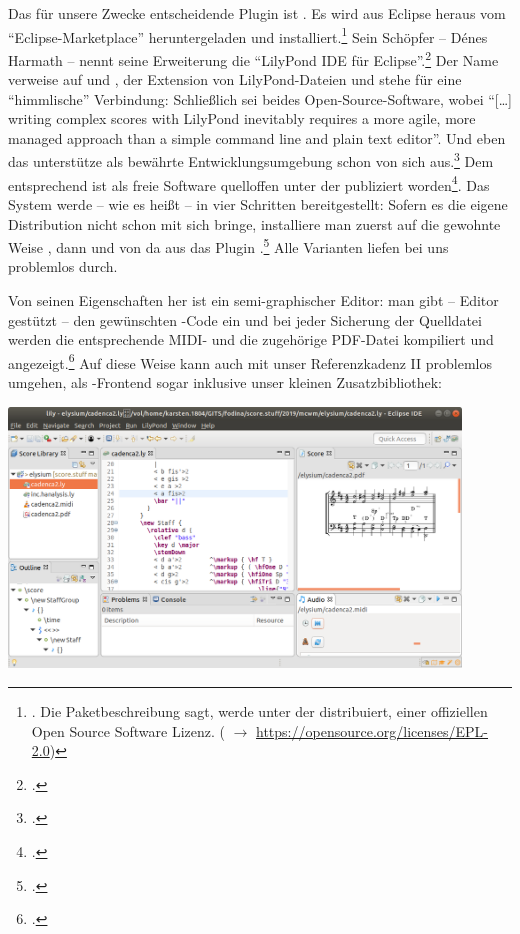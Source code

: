 Das für unsere Zwecke entscheidende Plugin ist . Es wird aus
Eclipse heraus vom \enquote{Eclipse-Marketplace} heruntergeladen und
installiert.\footnote{\cite[vgl.][\nopage wp]{Harmath2019a}. Die
Paketbeschreibung sagt,  werde unter der  distribuiert, einer offiziellen Open Source Software Lizenz.
( $\rightarrow$ \href{https://opensource.org/licenses/EPL-2.0}
{https://opensource.org/licenses/EPL-2.0}) } Sein Schöpfer -- Dénes Harmath --
nennt seine Erweiterung die \enquote{LilyPond IDE für
Eclipse}.\footcite[vgl.][\nopage wp]{Harmath2019b} Der Name 
verweise auf  und , der Extension von LilyPond-Dateien und
stehe für eine \enquote{himmlische} Verbindung: Schließlich sei beides
Open-Source-Software, wobei \enquote{[\ldots] writing complex scores with
LilyPond inevitably requires a more agile, more managed approach than a simple
command line and plain text editor}. Und eben das unterstütze  als
bewährte Entwicklungsumgebung schon von sich aus.\footcite[vgl.][\nopage
wp]{Harmath2019d} Dem entsprechend ist  als freie Software
quelloffen unter der  publiziert
worden\footcite[vgl.][\nopage wp]{Harmath2018a}. Das System werde -- wie es
heißt -- in vier Schritten bereitgestellt: Sofern es die eigene Distribution
nicht schon mit sich bringe, installiere man zuerst auf die gewohnte Weise
, dann  und von da aus das Plugin
.\footcite[vgl.][\nopage wp]{Harmath2019c} Alle Varianten liefen
bei uns problemlos durch.

Von seinen Eigenschaften her ist  ein semi-graphischer Editor: man
gibt -- Editor gestützt -- den gewünschten -Code ein und bei jeder
Sicherung der Quelldatei werden die entsprechende MIDI- und die zugehörige
PDF-Datei kompiliert und angezeigt.\footcite[vgl.][\nopage wp]{Harmath2019e} Auf
diese Weise kann  auch mit unser Referenzkadenz II problemlos
umgehen, als -Frontend sogar inklusive unser kleinen
Zusatzbibliothek:

\begin{center}
\includegraphics[width=0.9\textwidth]{frontends/elysium/elysium-cadenca2-300dpi.png}
\end{center}

